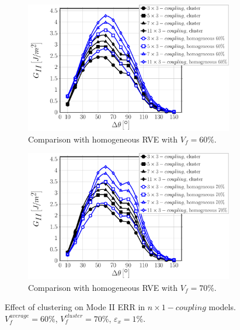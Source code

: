 \documentclass[review]{elsarticle}
\begin{document}
\begin{figure}[!h]
\centering
    \begin{subfigure}[b]{0.475\textwidth}
        \includegraphics[width=\textwidth]{nx1-coupling-vf60-GII.pdf}
        \caption{Comparison with homogeneous RVE with $V_{f}=60\%$.}\label{subfig:clusterCouplingModeII60}
    \end{subfigure}\quad
    \begin{subfigure}[b]{0.475\textwidth}
        \includegraphics[width=\textwidth]{nx1-coupling-vf70-GII.pdf}
        \caption{Comparison with homogeneous RVE with $V_{f}=70\%$.}\label{subfig:clusterCouplingModeII70}
    \end{subfigure}

\caption{Effect of clustering on Mode II ERR in $n\times 1-coupling$ models. $V^{average}_{f}=60\%$, $V^{cluster}_{f}=70\%$, $\varepsilon_{x}=1\%$.}\label{fig:clusterCouplingModeI}
\end{figure}
\end{document}
